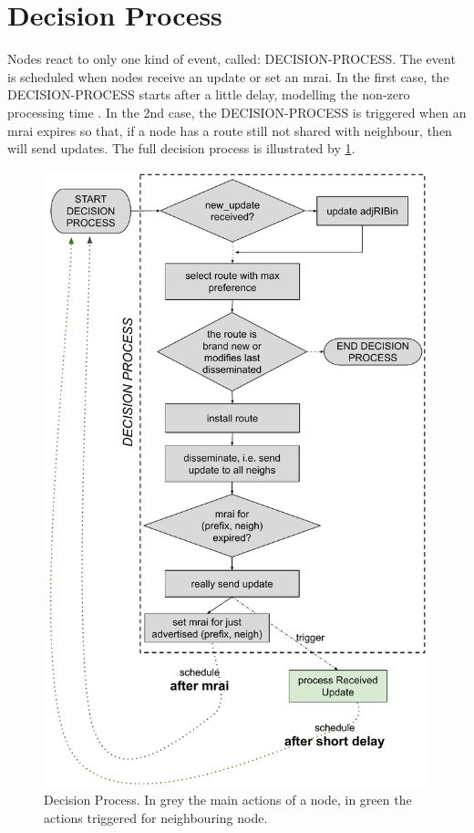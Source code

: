 \documentclass[fleqn,10pt]{SelfArx} %
\begin{document}
\section{Decision Process}

Nodes react to only one kind of event, called: DECISION-PROCESS. The event is scheduled when nodes receive an update or set an mrai.
In the first case, the DECISION-PROCESS starts after a little delay, modelling the non-zero processing time \cite{fabrikant2011there}.
In the 2nd case, the DECISION-PROCESS is triggered when an mrai expires so that, if a node has a route still not shared with neighbour, 
then will send updates. The full decision process is illustrated by \cref{fig:decisionprocess}.

\begin{figure}[ht]
\centering
\includegraphics[width=\linewidth]{figures/workflow}
\caption{Decision Process. In grey the main actions of a node, in green the actions triggered for neighbouring node.}
\label{fig:decisionprocess}
\end{figure}
\end{document}
